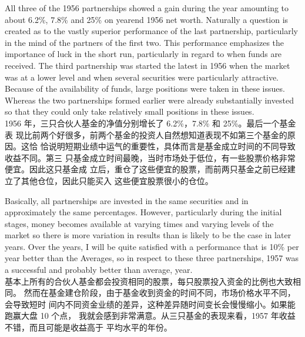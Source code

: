 \begin{verseparallel}
  {
    All three of the 1956 partnerships showed a gain during the year amounting
    to about 6.2\%, 7.8\% and 25\% on yearend 1956 net worth. Naturally a
    question is created as to the vastly superior performance of the last
    partnership, particularly in the mind of the partners of the first two. This
    performance emphasizes the importance of luck in the short run, particularly
    in regard to when funds are received. The third partnership was started the
    latest in 1956 when the market was at a lower level and when several
    securities were particularly attractive. Because of the availability of
    funds, large positions were taken in these issues. Whereas the two
    partnerships formed earlier were already substantially invested so that they
    could only take relatively small positions in these issues. \\
  }
  {
    1956 年，三只合伙人基金的净值分别增长了 6.2\%，7.8\% 和 25\%。最后一个基金表
    现比前两个好很多，前两个基金的投资人自然想知道表现不如第三个基金的原因。这恰
    恰说明短期业绩中运气的重要性，具体而言是基金成立时间的不同导致收益不同。第三
    只基金成立时间最晚，当时市场处于低位，有一些股票价格非常便宜。因此这只基金成
    立后，重仓了这些便宜的股票，而前两只基金之前已经建立了其他仓位，因此只能买入
    这些便宜股票很小的仓位。
  }
\end{verseparallel}

\begin{verseparallel}
  {
    Basically, all partnerships are invested in the same securities and in
    approximately the same percentages. However, particularly during the initial
    stages, money becomes available at varying times and varying levels of the
    market so there is more variation in results than is likely to be the case
    in later years. Over the years, I will be quite satisfied with a performance
    that is 10\% per year better than the Averages, so in respect to these three
    partnerships, 1957 was a successful and probably better than average, year. \\
  }
  {
    基本上所有的合伙人基金都会投资相同的股票，每只股票投入资金的比例也大致相同。
    然而在基金建仓阶段，由于基金收到资金的时间不同，市场价格水平不同，会导致短时
    间内不同资金业绩的差异，这种差异随时间变长会慢慢缩小。如果能跑赢大盘 10 个点，
    我就会感到非常满意。从三只基金的表现来看，1957 年收益不错，而且可能是收益高于
    平均水平的年份。
  }
\end{verseparallel}

